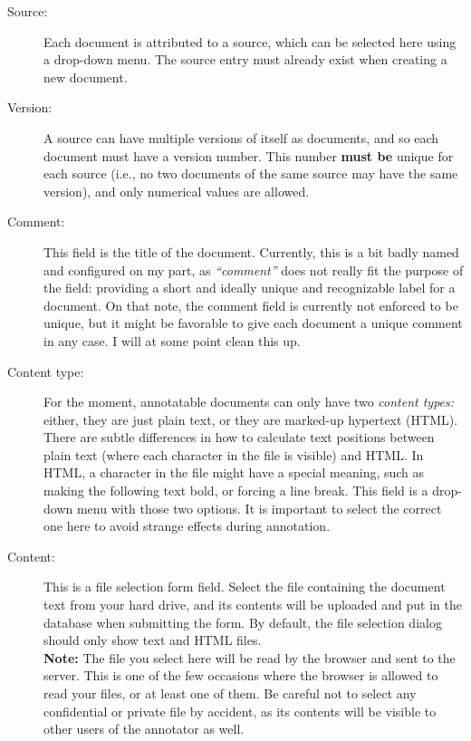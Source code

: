 \begin{description}
  \item[Source:]
    Each document is attributed to a source, which can be selected here using a drop-down menu.
    The source entry must already exist when creating a new document.

  \item[Version:]
    A source can have multiple versions of itself as documents, and so each document must have a version number.
    This number \textbf{must be} unique for each source (i.e., no two documents of the same source may have the same version), and only numerical values are allowed.

  \item[Comment:]
    This field is the title of the document.
    Currently, this is a bit badly named and configured on my part, as \emph{\enquote{comment}} does not really fit the purpose of the field: providing a short and ideally unique and recognizable label for a document.
    On that note, the comment field is currently not enforced to be unique, but it might be favorable to give each document a unique comment in any case.
    I will at some point clean this up.

  \item[Content type:]
    For the moment, annotatable documents can only have two \emph{content types:}
    either, they are just plain text, or they are marked-up hypertext (HTML).
    There are subtle differences in how to calculate text positions between plain text (where each character in the file is visible) and HTML.
    In HTML, a character in the file might have a special meaning, such as making the following text bold, or forcing a line break.
    This field is a drop-down menu with those two options.
    It is important to select the correct one here to avoid strange effects during annotation.

  \item[Content:]
    This is a file selection form field.
    Select the file containing the document text from your hard drive, and its contents will be uploaded and put in the database when submitting the form.
    By default, the file selection dialog should only show text and HTML files.\\
    \textbf{Note:} The file you select here will be read by the browser and sent to the server.
    This is one of the few occasions where the browser is allowed to read your files, or at least one of them.
    Be careful not to select any confidential or private file by accident, as its contents will be visible to other users of the annotator as well.
\end{description}

